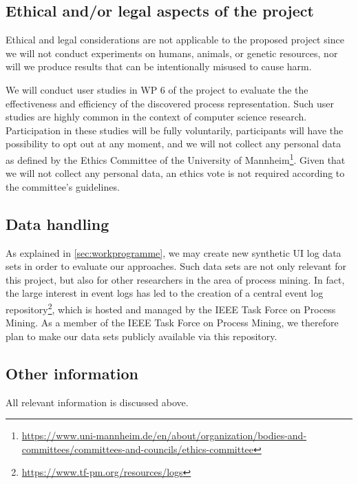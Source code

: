 
 \subsection{Ethical and/or legal aspects of the project}
 \label{sec:ethical}
 
Ethical and legal considerations are not applicable to the proposed project since we 
will not conduct experiments on humans, animals, or genetic resources, nor will we  produce results that can be intentionally misused to cause harm. 

We will conduct user studies in WP 6 of the project to evaluate the the effectiveness and efficiency of the discovered process representation. Such user studies are highly common in the context of computer science research. Participation in these studies will be fully voluntarily, participants will have the possibility to opt out at any moment, and we will not collect any personal data as defined by the Ethics Committee of the University of Mannheim\footnote{\url{https://www.uni-mannheim.de/en/about/organization/bodies-and-committees/committees-and-councils/ethics-committee}}. Given that we will not collect any personal data, an ethics vote is not required according to the committee's guidelines. 

\subsection{Data handling}

As explained in \autoref{sec:workprogramme}, we may create new synthetic UI log data sets in order to evaluate our approaches. Such data sets are not only relevant for this project, but also for other researchers in the area of process mining. In fact, the large interest in event logs has led to the creation of a central event log repository\footnote{\url{https://www.tf-pm.org/resources/logs}}, which is hosted and managed by the IEEE Task Force on Process Mining. As a member of the IEEE Task Force on Process Mining, we therefore plan to make our data sets publicly available via this repository.


\subsection{Other information}

All relevant information is discussed above. 